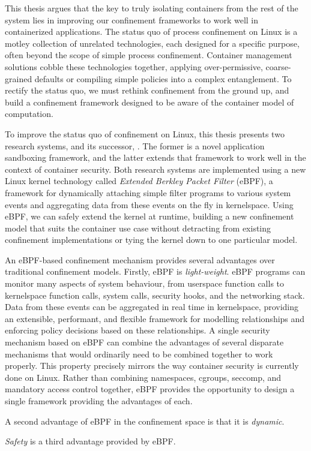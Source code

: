 \begin{inprogress}
This thesis argues that the key to truly isolating containers from the rest of the system
lies in improving our confinement frameworks to work well in containerized applications.
The status quo of process confinement on Linux is a motley collection of unrelated
technologies, each designed for a specific purpose, often beyond the scope of simple
process confinement. Container management solutions cobble these technologies together,
applying over-permissive, coarse-grained defaults or compiling simple policies into
a complex entanglement. To rectify the status quo, we must rethink confinement from the
ground up, and build a confinement framework designed to be aware of the container model
of computation.

To improve the status quo of confinement on Linux, this thesis presents two research
systems, \bpfbox{} and its successor, \bpfcontain{}. The former is a novel application
sandboxing framework, and the latter extends that framework to work well in the context of
container security. Both research systems are implemented using a new Linux kernel
technology called \textit{Extended Berkley Packet Filter} (eBPF), a framework for
dynamically attaching simple filter programs to various system events and aggregating data
from these events on the fly in kernelspace. Using eBPF, we can safely extend the kernel
at runtime, building a new confinement model that suits the container use case without
detracting from existing confinement implementations or tying the kernel down to one
particular model.

An eBPF-based confinement mechanism provides several advantages over traditional
confinement models.  Firstly, eBPF is \textit{light-weight}. eBPF programs can monitor
many aspects of system behaviour, from userspace function calls to kernelspace function
calls, system calls, security hooks, and the networking stack. Data from these events can
be aggregated in real time in kernelspace, providing an extensible, performant, and
flexible framework for modelling relationships and enforcing policy decisions based on
these relationships.  A single security mechanism based on eBPF can combine the advantages
of several disparate mechanisms that would ordinarily need to be combined together to work
properly. This property precisely mirrors the way container security is currently done on
Linux. Rather than combining namespaces, cgroups, seccomp, and mandatory access control
together, eBPF provides the opportunity to design a single framework providing the
advantages of each.

A second advantage of eBPF in the confinement space is that it is \textit{dynamic}. 

\textit{Safety} is a third advantage provided by eBPF. 
\end{inprogress}


